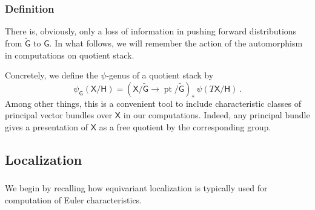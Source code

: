 \documentclass[14pt]{extarticle}
\newcommand{\bG}{\mathsf{G}}
\newcommand{\bH}{\mathsf{H}}
\newcommand{\bGt}{{\widetilde{\mathsf{G}}}}
\newcommand{\bX}{\mathsf{X}}
\newcommand{\fg}{\mathfrak{g}}
\newcommand{\rd}{/\!\!/\!\!/\!\!/}
\DeclareMathOperator{\pt}{pt}
\theoremstyle{definition}
\begin{document}
\subsubsection{Definition}

There is, obviously, only a loss of information in pushing forward
distributions from $\widetilde{\bG}$ to $\bG$. In what follows, we
will remember the action of the automorphism in computations on
quotient stack.

Concretely, we define the $\psi$-genus of a quotient stack by
%
\begin{equation}
\psi_\bG(\bX/\bH) = (\bX/\bGt \to \pt/\bGt)_*\, 
\psi(T\bX/\bH) \,. \label{eq:175}
\end{equation}
%
Among other things, this is a convenient tool to include
characteristic classes of principal vector bundles over $\bX$ in our
computations. Indeed, any principal bundle gives a presentation of
$\bX$ as a free quotient by the corresponding group. 

 






\subsection{Localization}




\subsubsection{}

We begin by recalling how equivariant localization is typically used
for computation of Euler characteristics. 
\end{document}
